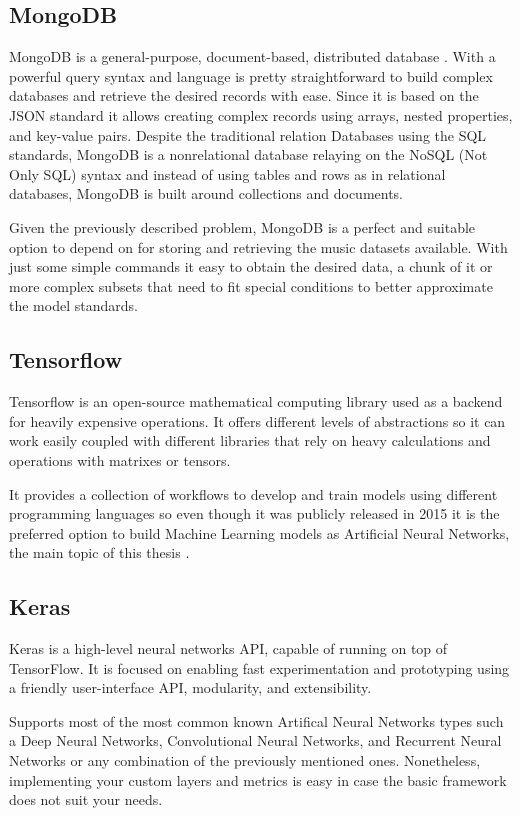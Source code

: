 \subsection{MongoDB}
MongoDB is a general-purpose, document-based, distributed database \cite{mongo}.
With a powerful query syntax and language is pretty straightforward to build complex databases and retrieve the desired records with ease.
Since it is based on the JSON\cite{json} standard it allows creating complex records using arrays, nested properties, and key-value pairs.
Despite the traditional relation Databases using the SQL standards, MongoDB is a nonrelational database relaying on the NoSQL (Not Only SQL) syntax and instead of using tables and rows as in relational databases, MongoDB is built around collections and documents.

Given the previously described problem, MongoDB is a perfect and suitable option to depend on for storing and retrieving the music datasets available. With just some simple commands it easy to obtain the desired data, a chunk of it or more complex subsets that need to fit special conditions to better approximate the model standards.

\subsection{Tensorflow}
Tensorflow is an open-source mathematical computing library used as a backend for heavily expensive operations.
It offers different levels of abstractions so it can work easily coupled with different libraries that rely on heavy calculations and operations with matrixes or tensors.

It provides a collection of workflows to develop and train models using different programming languages so even though it was publicly released in 2015 it is the preferred option to build Machine Learning models as Artificial Neural Networks, the main topic of this thesis \cite{tensorflow}.

\subsection{Keras}
Keras is a high-level neural networks API, capable of running on top of TensorFlow. 
It is focused on enabling fast experimentation and prototyping using a friendly user-interface API, modularity, and extensibility. 

Supports most of the most common known Artifical Neural Networks types such a Deep Neural Networks, Convolutional Neural Networks, and Recurrent Neural Networks or any combination of the previously mentioned ones. 
Nonetheless, implementing your custom layers and metrics is easy in case the basic framework does not suit your needs.


